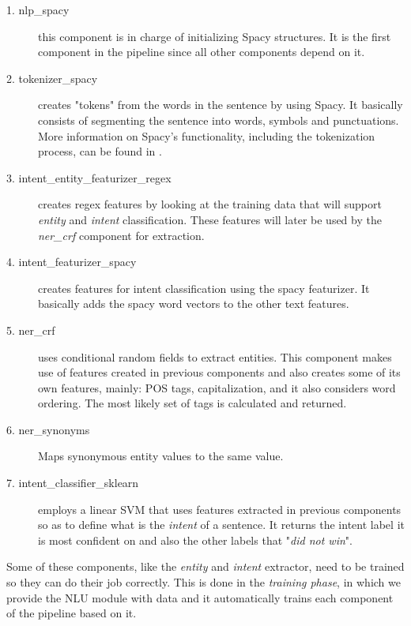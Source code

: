 \documentclass[11pt,a4paper]{article}
\begin{document}
			\begin{description}
				\item[1. nlp\_spacy] 
				this component is in charge of initializing Spacy structures. It is the first component in the pipeline since all other components depend on it. 
				
				\item[2. tokenizer\_spacy] 
				creates "tokens" from the words in the sentence by using Spacy. It basically consists of segmenting the sentence into words, symbols and punctuations. More information on Spacy's functionality, including the tokenization process, can be found in \cite{spacy-tokenization}.
				
				\item[3. intent\_entity\_featurizer\_regex] 
				creates regex features by looking at the training data that will support \textit{entity} and \textit{intent} classification. These features will later be used by the \textit{ner\_crf} component for extraction.
				
				\item[4. intent\_featurizer\_spacy] 
				creates features for intent classification using the spacy featurizer. It basically adds the spacy word vectors to the other text features.
				
				\item[5. ner\_crf] 
				uses conditional random fields to extract entities. This component makes use of features created in previous components and also creates some of its own features, mainly: POS tags, capitalization, and it also considers word ordering. The most likely set of tags is calculated and returned.
				
				\item[6. ner\_synonyms] 	
				Maps synonymous entity values to the same value. 
				
				\item[7. intent\_classifier\_sklearn] 
				employs a linear SVM that uses features extracted in previous components so as to define what is the \textit{intent} of a sentence. It returns the intent label it is most confident on and also the other labels that "\textit{did not win}".
				
			\end{description}
			
			Some of these components, like the \textit{entity} and \textit{intent} extractor, need to be trained so they can do their job correctly. This is done in the \textit{training phase}, in which we provide the NLU module with data and it automatically trains each component of the pipeline based on it.
\end{document}
